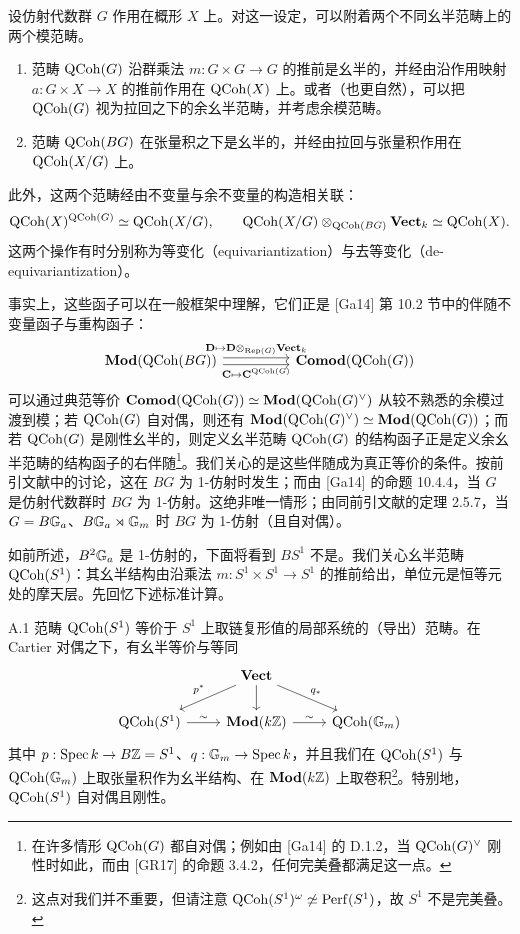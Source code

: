 设仿射代数群 $G$ 作用在概形 $X$ 上。对这一设定，可以附着两个不同幺半范畴上的两个模范畴。

\begin{enumerate}[(1)]
\item 范畴 $\operatorname{QCoh}(G)$ 沿群乘法 $m:G\times G\to G$ 的推前是幺半的，并经由沿作用映射 $a:G\times X\to X$ 的推前作用在 $\operatorname{QCoh}(X)$ 上。或者（也更自然），可以把 $\operatorname{QCoh}(G)$ 视为拉回之下的余幺半范畴，并考虑余模范畴。
\item 范畴 $\operatorname{QCoh}(BG)$ 在张量积之下是幺半的，并经由拉回与张量积作用在 $\operatorname{QCoh}(X/G)$ 上。
\end{enumerate}

此外，这两个范畴经由不变量与余不变量的构造相关联：
\[
\operatorname{QCoh}(X)^{\operatorname{QCoh}(G)}\simeq\operatorname{QCoh}(X/G),\qquad \operatorname{QCoh}(X/G)\otimes_{\operatorname{QCoh}(BG)}\mathbf{Vect}_k\simeq\operatorname{QCoh}(X).
\]
这两个操作有时分别称为等变化（equivariantization）与去等变化（de-equivariantization）。

事实上，这些函子可以在一般框架中理解，它们正是 [Ga14] 第 10.2 节中的伴随不变量函子与重构函子：
\[
\begin{tikzcd}
\mathbf{Mod}(\QCoh(BG))\arrow[rr,shift left,"\mathbf D\mapsto\mathbf D\otimes_{\Rep(G)}\mathbf{Vect}_k"]\arrow[rr,shift right,"\mathbf C\mapsto\mathbf C^{\QCoh(G)}"'] & & \mathbf{Comod}(\QCoh(G))
\end{tikzcd}
\]
可以通过典范等价 $\mathbf{Comod}(\operatorname{QCoh}(G))\simeq\mathbf{Mod}(\operatorname{QCoh}(G)^\vee)$ 从较不熟悉的余模过渡到模；若 $\operatorname{QCoh}(G)$ 自对偶，则还有 $\mathbf{Mod}(\operatorname{QCoh}(G)^\vee)\simeq\mathbf{Mod}(\operatorname{QCoh}(G))$；而若 $\operatorname{QCoh}(G)$ 是刚性幺半的，则定义幺半范畴 $\operatorname{QCoh}(G)$ 的结构函子正是定义余幺半范畴的结构函子的右伴随\footnote{在许多情形 $\operatorname{QCoh}(G)$ 都自对偶；例如由 [Ga14] 的 D.1.2，当 $\operatorname{QCoh}(G)^\vee$ 刚性时如此，而由 [GR17] 的命题 3.4.2，任何完美叠都满足这一点。}。我们关心的是这些伴随成为真正等价的条件。按前引文献中的讨论，这在 $BG$ 为 1-仿射时发生；而由 [Ga14] 的命题 10.4.4，当 $G$ 是仿射代数群时 $BG$ 为 1-仿射。这绝非唯一情形；由同前引文献的定理 2.5.7，当 $G=B\mathbb{G}_a$、$B\mathbb{G}_a\rtimes\mathbb{G}_m$ 时 $BG$ 为 1-仿射（且自对偶）。

如前所述，$B^2\mathbb{G}_a$ 是 1-仿射的，下面将看到 $BS^1$ 不是。我们关心幺半范畴 $\operatorname{QCoh}(S^1)$：其幺半结构由沿乘法 $m:S^1\times S^1\to S^1$ 的推前给出，单位元是恒等元处的摩天层。先回忆下述标准计算。


\begin{prop}{A.1}\label{prop:a5-03-A-1}
范畴 $\operatorname{QCoh}(S^1)$ 等价于 $S^1$ 上取链复形值的局部系统的（导出）范畴。在 Cartier 对偶之下，有幺半等价与等同
\[
\begin{tikzcd}
& \mathbf{Vect} \arrow[dl,"p^*"'] \arrow[d] \arrow[dr,"q_*"] & \\
\QCoh(S^1) \arrow[r,"\sim"] & \mathbf{Mod}(k\Z) \arrow[r,"\sim"] & \QCoh(\GG_m)
\end{tikzcd}
\]
其中 $p:\operatorname{Spec} k\to B\mathbb{Z}=S^1$、$q:\mathbb{G}_m\to\operatorname{Spec} k$，并且我们在 $\operatorname{QCoh}(S^1)$ 与 $\operatorname{QCoh}(\mathbb{G}_m)$ 上取张量积作为幺半结构、在 $\mathbf{Mod}(k\mathbb{Z})$ 上取卷积\footnote{这点对我们并不重要，但请注意 $\operatorname{QCoh}(S^1)^\omega\not\simeq\operatorname{Perf}(S^1)$，故 $S^1$ 不是完美叠。}。特别地，$\operatorname{QCoh}(S^1)$ 自对偶且刚性。
\end{prop}

